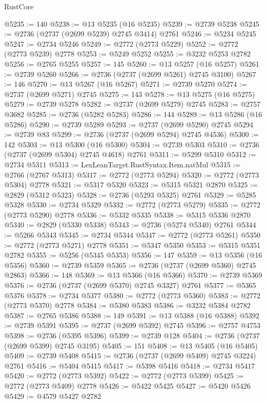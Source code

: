 \begin{lexlean}{RustCore}
\begin{coremodule}
@5235 := 140
@5238 := @13 @5235 (@16 @5235)
@5239 := @2739 @5238
@5245 := @2736 (@2737 (@2699 @5239) @2745 @3414) @2761
@5246 := @5234 @5245
@5247 := @2734 @5246
@5249 := @2772 (@2773 @5229)
@5252 := @2772 (@2773 @5239) @2778
@5253 := @5249 @5252
@5255 := @3232 @5253 @2782
@5256 := @2765 @5255
@5257 := 145
@5260 := @13 @5257 (@16 @5257)
@5261 := @2739 @5260
@5266 := @2736 (@2737 (@2699 @5261) @2745 @3100)
@5267 := 146
@5270 := @13 @5267 (@16 @5267)
@5271 := @2739 @5270
@5274 := @2737 (@2699 @5271) @2745
@5275 := 143
@5278 := @13 @5275 (@16 @5275)
@5279 := @2739 @5278
@5282 := @2737 (@2699 @5279) @2745
@5283 := @2757 @3682
@5285 := @2736 (@5282 @5283)
@5286 := 144
@5289 := @13 @5286 (@16 @5286)
@5290 := @2739 @5289
@5293 := @2737 (@2699 @5290) @2745
@5294 := @2739 @83
@5299 := @2736 (@2737 (@2699 @5294) @2745 @4536)
@5300 := 142
@5303 := @13 @5300 (@16 @5300)
@5304 := @2739 @5303
@5310 := @2736 (@2737 (@2699 @5304) @2745 @4618) @2761
@5311 := @5299 @5310
@5312 := @2734 @5311
@5313 := LexLeanTarget.RustSyntax.Item.natMul
@5315 := @2766 (@2767 @5313)
@5317 := @2772 (@2773 @5294)
@5320 := @2772 (@2773 @5304) @2778
@5321 := @5317 @5320
@5323 := @5315 @5321 @2870
@5325 := @2829 (@5312 @5323)
@5328 := @2736 (@5293 @5325) @2761
@5329 := @5285 @5328
@5330 := @2734 @5329
@5332 := @2772 (@2773 @5279)
@5335 := @2772 (@2773 @5290) @2778
@5336 := @5332 @5335
@5338 := @5315 @5336 @2870
@5340 := @2829 (@5330 @5338)
@5343 := @2736 (@5274 @5340) @2761
@5344 := @5266 @5343
@5345 := @2734 @5344
@5347 := @2772 (@2773 @5261)
@5350 := @2772 (@2773 @5271) @2778
@5351 := @5347 @5350
@5353 := @5315 @5351 @2782
@5355 := @5256 (@5345 @5353)
@5356 := 147
@5359 := @13 @5356 (@16 @5356)
@5360 := @2739 @5359
@5365 := @2736 (@2737 (@2699 @5360) @2745 @2863)
@5366 := 148
@5369 := @13 @5366 (@16 @5366)
@5370 := @2739 @5369
@5376 := @2736 (@2737 (@2699 @5370) @2745 @3327) @2761
@5377 := @5365 @5376
@5378 := @2734 @5377
@5380 := @2772 (@2773 @5360)
@5383 := @2772 (@2773 @5370) @2778
@5384 := @5380 @5383
@5386 := @3232 @5384 @2782
@5387 := @2765 @5386
@5388 := 149
@5391 := @13 @5388 (@16 @5388)
@5392 := @2739 @5391
@5395 := @2737 (@2699 @5392) @2745
@5396 := @2757 @4753
@5398 := @2736 (@5395 @5396)
@5399 := @2739 @128
@5404 := @2736 (@2737 (@2699 @5399) @2745 @3195)
@5405 := 151
@5408 := @13 @5405 (@16 @5405)
@5409 := @2739 @5408
@5415 := @2736 (@2737 (@2699 @5409) @2745 @3224) @2761
@5416 := @5404 @5415
@5417 := @5398 @5416
@5418 := @2734 @5417
@5420 := @2772 (@2773 @5392)
@5422 := @2772 (@2773 @5399)
@5425 := @2772 (@2773 @5409) @2778
@5426 := @5422 @5425
@5427 := @5420 @5426
@5429 := @4579 @5427 @2782

\end{coremodule}
\end{lexlean}
